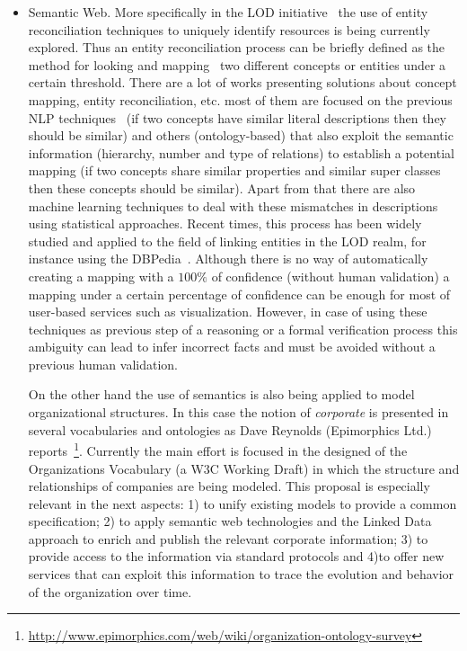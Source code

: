 \documentclass[1p,12pt]{elsarticle}
\begin{document}
\begin{itemize}
 \item Semantic Web. More specifically in the LOD initiative~\citep{Berners-Lee-2006} the use of entity reconciliation techniques to uniquely identify resources 
 is being currently explored. Thus an entity reconciliation process can be briefly defined as the method for looking and mapping~\citep{DBLP:conf/semweb/IseleJB10,DBLP:conf/icwe/IseleJB12} two different 
 concepts or entities under a certain threshold. There are a lot of  works presenting solutions about concept mapping, entity reconciliation, etc. 
 most of them are focused on the previous NLP techniques~\citep{conf/www/MaaliCP11,Serimi} (if two concepts have similar literal descriptions then they should be similar) 
 and others (ontology-based) that also exploit the semantic information (hierarchy, number and type of relations) to establish a potential mapping 
 (if two concepts share similar properties and similar super classes then these concepts should be similar). Apart from that 
 there are also machine learning techniques to deal with these mismatches in descriptions using statistical approaches. Recent times, 
 this process has been widely studied and applied to the field of linking entities in the LOD realm, for instance using the DBPedia~\citep{Mendes:2011:DSS:2063518.2063519}. 
 Although there is no way of automatically creating a mapping with a $100\%$ of confidence (without human validation) a mapping under a certain percentage of confidence can be 
 enough for most of user-based services such as visualization. However, in case of using these techniques as previous step of a reasoning or 
 a formal verification process this ambiguity can lead to infer incorrect facts and must be avoided without a previous human validation. 

 On the other hand the use of semantics is also being applied to model organizational structures. In this case the notion 
 of \textit{corporate} is presented in several vocabularies and ontologies as Dave Reynolds (Epimorphics Ltd.) 
 reports~\footnote{\url{http://www.epimorphics.com/web/wiki/organization-ontology-survey}}. 
 Currently the main effort is focused in the designed of the Organizations Vocabulary (a W3C Working Draft) in which the structure and 
 relationships of companies are being modeled. This proposal is especially relevant in the next aspects:  
 1) to unify existing models to provide a common specification; 2) to apply semantic web technologies and the Linked Data approach to enrich 
 and publish the relevant corporate information; 3) to provide access to the information via standard protocols 
 and 4)to  offer new services that can exploit this information to trace the evolution and behavior of the organization over time.


\end{itemize}
\end{document}
